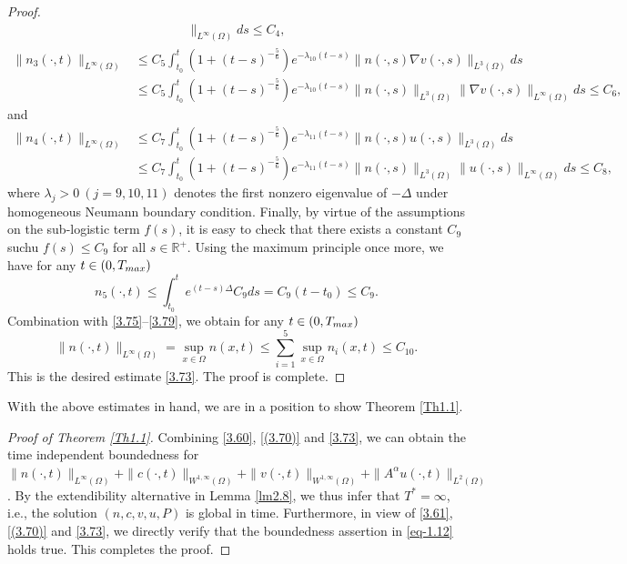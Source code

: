\documentclass[10pt,a4paper]{amsart}
\numberwithin{equation}{section}
\begin{document}
\begin{proof}
\begin{equation}
\begin{aligned}
 \|_{L^\infty(\Omega)} ds \leq C_{4},
\end{aligned}
\end{equation}
\begin{equation}
\begin{aligned}\label{3.77}
\| n_3(\cdot,t) \|_{L^\infty(\Omega)}
&\leq C_{5} \int_{t_0}^t ( 1 + (t - s)^{-\frac{5}{6}} ) e^{-\lambda_{10} (t-s)} \| n(\cdot, s) \nabla v(\cdot, s) \|_{L^{3}(\Omega)} ds \\
&\leq C_{5} \int_{t_0}^t ( 1 + (t - s)^{-\frac{5}{6}} ) e^{-\lambda_{10} (t-s)} \| n(\cdot, s) \|_{L^3(\Omega)} \| \nabla v(\cdot, s)
\|_{L^\infty(\Omega)} ds \leq C_{6},
\end{aligned}
\end{equation}
and
\begin{equation}
\begin{aligned}\label{3.78}
\| n_4(\cdot,t) \|_{L^\infty(\Omega)}
&\leq C_{7} \int_{t_0}^t ( 1 + (t - s)^{-\frac{5}{6}} ) e^{-\lambda_{11} (t - s)} \| n(\cdot, s) u(\cdot, s) \|_{L^3(\Omega)} ds \\
&\leq C_{7} \int_{t_0}^t ( 1 + (t - s)^{-\frac{5}{6}} ) e^{-\lambda_{11} (t - s)} \| n(\cdot, s) \|_{L^3(\Omega)} \| u(\cdot, s) \|_{L^\infty(\Omega)} ds
\leq C_{8},
\end{aligned}
\end{equation}
where $\lambda_j > 0  \ (j = 9, 10, 11) $ denotes the first nonzero eigenvalue of
 $-\Delta$ under homogeneous Neumann boundary condition.
Finally, by virtue of the assumptions on the sub-logistic term $f(s)$, 
it is easy to check that there exists a constant $C_9$ suchu $f(s) \leq C_9 $ for 
all \( s \in \mathbb{R}^+ \). Using the maximum principle once more, we have for any 
$t\in (0,T_{\rm max})$
\begin{equation}\label{3.79}
n_5(\cdot, t) \leq \int_{t_0}^t e^{(t-s)\Delta} C_9 ds = C_9(t - t_0) \leq C_9.
\end{equation}
Combination with \eqref{3.75}--\eqref{3.79}, we obtain for any $t\in (0,T_{\rm max})$
\[
\|n(\cdot, t)\|_{L^\infty(\Omega)} = \sup_{x\in\Omega} n(x,t) 
\leq \sum^5_{i=1}\sup_{x\in\Omega} n_i(x,t)\leq C_{10}.
\]
This is the desired estimate \eqref{3.73}. The proof is complete.
\end{proof}

With the above estimates in hand, we are in a position to show Theorem \ref{Th1.1}.

\begin{proof}[Proof of Theorem \ref{Th1.1}]
Combining \eqref{3.60}, \eqref{(3.70)} and \eqref{3.73}, we can obtain the time 
independent boundedness for 
$\|n(\cdot, t)\|_{L^\infty(\Omega)} + \|c(\cdot, t)\|_{W^{1,\infty}(\Omega)} 
+ \|v(\cdot, t)\|_{W^{1,\infty}(\Omega)}+ \|A^\alpha u (\cdot, t)\|_{L^2(\Omega)}$. 
By the extendibility alternative in Lemma \ref{lm2.8}, we thus infer that $T^*=\infty$, 
i.e., the solution $(n, c, v, u, P)$ is global in time. Furthermore, in view of 
\eqref{3.61}, \eqref{(3.70)} and \eqref{3.73},  we directly verify that the boundedness 
assertion in \eqref{eq-1.12} holds true. This completes the proof.
\end{proof}
\end{document}
